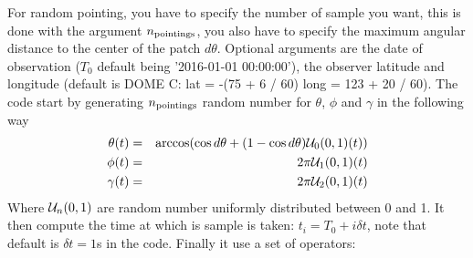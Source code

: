 \documentclass[a4paper, 11pt]{article}
\def\ba{\begin{eqnarray}}
\def\ea{\end{eqnarray}}
\begin{document}
For random pointing, you have to specify the number of sample you want, this is done with the argument $n_{\rm pointings}$, you also have to specify the maximum angular distance to the center of the patch $d\theta$. Optional arguments are the date of observation ($T_{0}$ default being '2016-01-01 00:00:00'), the observer latitude and longitude (default is DOME C: lat = -(75 + 6 / 60)  long = 123 + 20 / 60).
The code start by generating $n_{\rm pointings}$ random number for $\theta$, $\phi$ and $\gamma$ in the following way 
\ba
\theta(t) &=& \arccos ( \cos d\theta + (1- \cos d\theta ){\cal U}_{0}(0,1)(t) ) \\
\phi(t) &=& 2\pi {\cal U}_{1}(0,1)(t)  \\
\gamma(t) &=& 2\pi {\cal U}_{2}(0,1) (t)
\ea
Where ${\cal U}_{n}(0,1)$ are random number uniformly distributed between 0 and 1.
It then compute the time at which is sample is taken: $t_{i}= T_{0}+  i \delta t$, note that default is $\delta t=1$s in the code.
Finally it use a set of operators:
\end{document}
